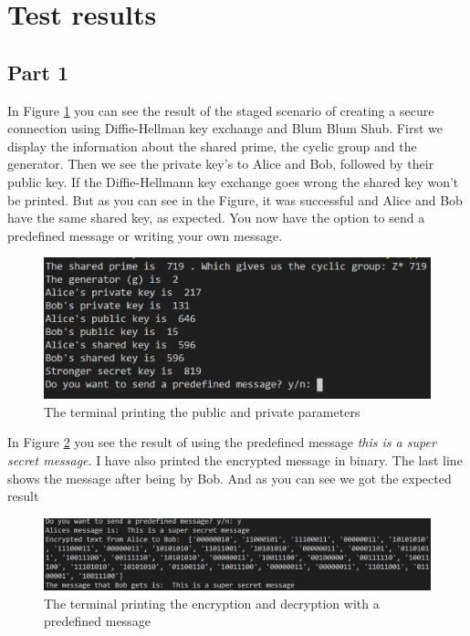 \documentclass[12pt, letterpaper]{article}
\begin{document}
\section*{Test results}

\subsection*{Part 1}
In Figure \ref{fig:runYN} you can see the result of the staged scenario of creating a secure connection using Diffie-Hellman key exchange and Blum Blum Shub. First we display the information about the shared prime, the cyclic group and the generator. Then we see the private key's to Alice and Bob, followed by their public key. If the Diffie-Hellmann key exchange goes wrong the shared key won't be printed. But as you can see in the Figure, it was successful and Alice and Bob have the same shared key, as expected. You now have the option to send a predefined message or writing your own message.

\begin{figure}[H]
  \includegraphics[width=\linewidth]{code_snippets/runYN.PNG}
  \caption{The terminal printing the public and private parameters}
  \label{fig:runYN}
\end{figure}

In Figure \ref{fig:runY} you see the result of using the predefined message \textit{this is a super secret message}. I have also printed the encrypted message in binary. The last line shows the message after being by Bob. And as you can see we got the expected result 

\begin{figure}[H]
  \includegraphics[width=\linewidth]{code_snippets/runY.PNG}
  \caption{The terminal printing the encryption and decryption with a predefined message}
  \label{fig:runY}
\end{figure}
\end{document}
